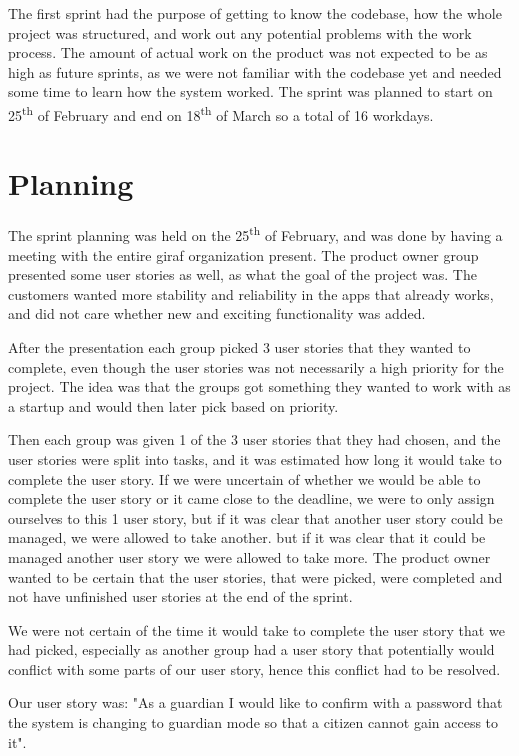 The first sprint had the purpose of getting to know the codebase, how the whole project was structured, and work out any potential problems with the work process. 
The amount of actual work on the product was not expected to be as high as future sprints, as we were not familiar with the codebase yet and needed some time to learn how the system worked. 
The sprint was planned to start on 25\textsuperscript{th} of February and end on 18\textsuperscript{th} of March so a total of 16 workdays.

\section{Planning}
The sprint planning was held on the 25\textsuperscript{th} of February, and was done by having a meeting with the entire giraf organization present. 
The product owner group presented some user stories as well, as what the goal of the project was. 
The customers wanted more stability and reliability in the apps that already works, and did not care whether new and exciting functionality was added. 

After the presentation each group picked 3 user stories that they wanted to complete, even though the user stories was not necessarily a high priority for the project. 
The idea was that the groups got something they wanted to work with as a startup and would then later pick based on priority.

Then each group was given 1 of the 3 user stories that they had chosen, and the user stories were split into tasks, and it was estimated how long it would take to complete the user story. 
If we were uncertain of whether we would be able to complete the user story or it came close to the deadline, we were to only assign ourselves to this 1 user story, but if it was clear that another user story could be managed, we were allowed to take another.
but if it was clear that it could be managed another user story we were allowed to take more. 
The product owner wanted to be certain that the user stories, that were picked, were completed and not have unfinished user stories at the end of the sprint.

We were not certain of the time it would take to complete the user story that we had picked, especially as another group had a user story that potentially would conflict with some parts of our user story, hence this conflict had to be resolved.

Our user story was: "As a guardian I would like to confirm with a password that the system is changing to guardian mode so that a citizen cannot gain access to it".

